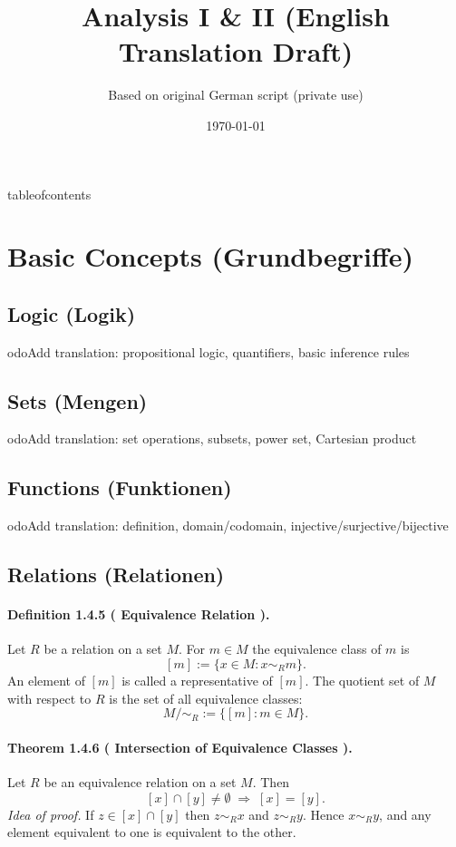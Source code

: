 \documentclass[12pt,a4paper]{article}
\title{Analysis I \& II \newline\small (English Translation Draft)}
\author{Based on original German script (private use)}
\date{\today}
\newcommand{\NumberedDefinition}[3]{%
	\paragraph{Definition #1 ( #2 ).} #3\par
}
\newcommand{\NumberedTheorem}[3]{%
	\paragraph{Theorem #1 ( #2 ).} #3\par
}
\theoremstyle{plain}
\theoremstyle{definition}
\theoremstyle{remark}
\begin{document}
\maketitle
	tableofcontents
\newpage

\section{Basic Concepts (Grundbegriffe)}

\subsection{Logic (Logik)}
	odo{Add translation: propositional logic, quantifiers, basic inference rules}

\subsection{Sets (Mengen)}
	odo{Add translation: set operations, subsets, power set, Cartesian product}

\subsection{Functions (Funktionen)}
	odo{Add translation: definition, domain/codomain, injective/surjective/bijective}

\subsection{Relations (Relationen)}\label{subsec:relations}

\NumberedDefinition{1.4.5}{Equivalence Relation}{Let $R$ be a relation on a set $M$. For $m\in M$ the equivalence class of $m$ is
\[
	[m] := \{x\in M : x\sim_R m\}.
\]
An element of $[m]$ is called a representative of $[m]$. The quotient set of $M$ with respect to $R$ is the set of all equivalence classes:
\[
	M/\!\sim_R := \{[m]: m\in M\}.
\]
}

\NumberedTheorem{1.4.6}{Intersection of Equivalence Classes}{Let $R$ be an equivalence relation on a set $M$. Then
\[
	[x] \cap [y] \neq \emptyset \;\Longrightarrow\; [x]=[y].
\]
\emph{Idea of proof.} If $z\in [x]\cap [y]$ then $z\sim_R x$ and $z\sim_R y$. Hence $x\sim_R y$, and any element equivalent to one is equivalent to the other.
}
\end{document}

